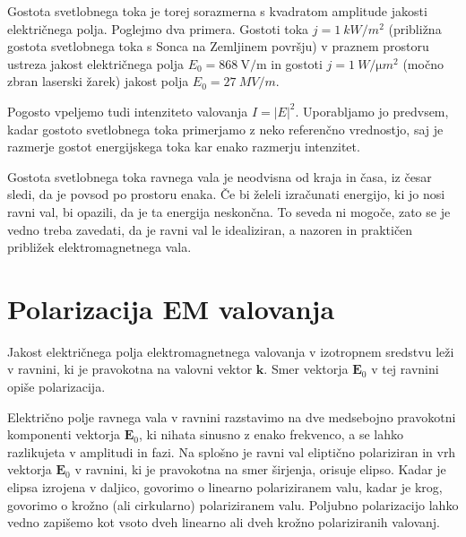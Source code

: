 Gostota svetlobnega toka je torej sorazmerna
s kvadratom amplitude jakosti električnega polja. Poglejmo dva primera.
Gostoti toka $j=1~\si{kW/m^{2}}$
(približna gostota svetlobnega toka s Sonca na Zemljinem površju) v praznem prostoru ustreza 
jakost električnega polja $E_{0}=868~\si{\volt/\meter}$ in gostoti $j=1~\si{W/\micro m^{2}}$ 
(močno zbran laserski žarek) jakost polja $E_{0}=27~\si{MV/m}$. 

Pogosto vpeljemo tudi intenziteto valovanja $I= |E|^2$. Uporabljamo jo 
predvsem, kadar gostoto svetlobnega toka primerjamo z neko referenčno vrednostjo, 
saj je razmerje gostot energijskega toka kar enako razmerju intenzitet.

Gostota svetlobnega toka ravnega vala je neodvisna od kraja in časa, iz česar sledi,
da je povsod po prostoru enaka. Če bi želeli izračunati energijo,
ki jo nosi ravni val, bi opazili, da je ta energija neskončna. To
seveda ni mogoče, zato se je vedno treba zavedati, da je ravni val
le idealiziran, a nazoren in praktičen približek elektromagnetnega
vala.

\section{Polarizacija EM valovanja}
Jakost električnega polja elektromagnetnega valovanja v izotropnem
sredstvu leži v ravnini, ki je pravokotna na valovni vektor $\mathbf{k}$. 
Smer vektorja $\mathbf{E}_0$ v tej ravnini opiše
polarizacija. 

Električno polje ravnega vala v ravnini razstavimo na dve medsebojno 
pravokotni komponenti vektorja $\mathbf{E}_0$, ki
nihata sinusno z enako frekvenco, a se lahko razlikujeta v amplitudi in fazi. 
Na splošno je ravni val eliptično polariziran in
vrh vektorja $\mathbf E_0$ v ravnini, ki je pravokotna 
na smer širjenja, orisuje elipso. Kadar je elipsa izrojena v daljico,
govorimo o linearno polariziranem valu,
kadar je krog, govorimo o krožno (ali cirkularno) polariziranem valu. 
Poljubno polarizacijo lahko vedno zapišemo kot vsoto dveh linearno ali dveh 
krožno polariziranih valovanj. 


